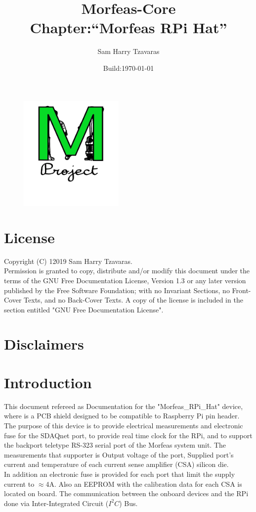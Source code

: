 \documentclass{article}
\title{Morfeas-Core\\Chapter:``Morfeas RPi Hat''}
\date{Build:\today}
\author{Sam Harry Tzavaras}
\begin{document}
\clearpage
\begin{figure}
\centering
  \includegraphics[width=2in]{../../../Docs/Morfeas_project_Documentation/ArtWork/Morfeas_logo_green.png}
\end{figure}
\maketitle
\thispagestyle{empty}
\newpage
\section{License}
Copyright (C)  12019  Sam Harry Tzavaras.\\
Permission is granted to copy, distribute and/or modify this document
under the terms of the GNU Free Documentation License, Version 1.3
or any later version published by the Free Software Foundation;
with no Invariant Sections, no Front-Cover Texts, and no Back-Cover Texts.
A copy of the license is included in the section entitled "GNU Free Documentation License".
\section{Disclaimers}
\newpage
\newpage
\tableofcontents
\newpage
\section{Introduction}
This document refereed as Documentation for the "Morfeas\_RPi\_Hat" device, where is a PCB shield designed to be compatible to Raspberry Pi pin header.
The purpose of this device is to provide electrical measurements and electronic fuse for the SDAQnet port, to provide real time clock for the RPi,
and to support the backport teletype RS-323 serial port of the Morfeas system unit. The measurements that supporter is Output voltage of the port,
Supplied port's current and temperature of each current sense amplifier (CSA) silicon die.\\
In addition an electronic fuse is provided for each port that limit the supply current to $\approx$4A.
Also an EEPROM with the calibration data for each CSA is located on board. The communication between the onboard devices and the RPi done
via Inter-Integrated Circuit ($I^2C$) Bus.
\end{document}
